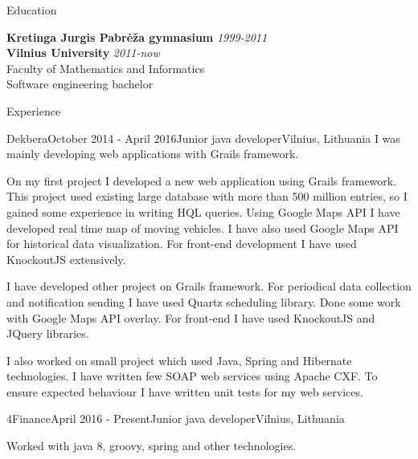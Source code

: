 \documentclass[]{resume} %
\begin{document}

\begin{rSection}{Education}

{\bf Kretinga Jurgis Pabrėža gymnasium} \hfill {\em 1999-2011} \\
{\bf Vilnius University} \hfill {\em 2011-now} \\
Faculty of Mathematics and Informatics\\
Software engineering bachelor\\

\end{rSection}

\begin{rSection}{Experience}

    \begin{rSubsection}{Dekbera}{October 2014 - April 2016}{Junior java developer}{Vilnius, Lithuania}
        I was mainly developing web applications with Grails framework.

        On my first project I developed a new web application using Grails framework.
        This project used existing large database with more than 500 million entries, so I gained some experience in writing HQL queries.
        Using Google Maps API I have developed real time map of moving vehicles.
        I have also used Google Maps API for historical data visualization.
        For front-end development I have used KnockoutJS extensively.

        I have developed other project on Grails framework.
        For periodical data collection and notification sending I have used Quartz scheduling library.
        Done some work with Google Maps API overlay.
        For front-end I have used KnockoutJS and JQuery libraries.

        I also worked on small project which used Java, Spring and Hibernate technologies.
        I have written few SOAP web services using Apache CXF.
        To ensure expected behaviour I have written unit tests for my web services.

    \end{rSubsection}
    
    
    \begin{rSubsection}{4Finance}{April 2016 - Present}{Junior java developer}{Vilnius, Lithuania}
        \item Worked with java 8, groovy, spring and other technologies.
        
    \end{rSubsection}
    

\end{rSection}
\end{document}
